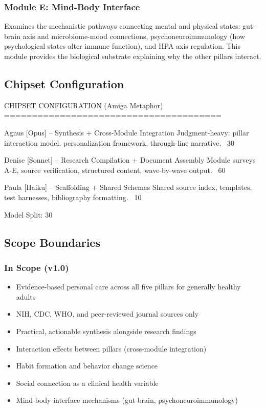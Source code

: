 \documentclass[11pt,letterpaper]{article}
\begin{document}
\subsubsection{Module E: Mind-Body Interface}
Examines the mechanistic pathways connecting mental and physical states: gut-brain axis and microbiome-mood connections, psychoneuroimmunology (how psychological states alter immune function), and HPA axis regulation. This module provides the biological substrate explaining why the other pillars interact.

\subsection{Chipset Configuration}

\begin{asciibox}
CHIPSET CONFIGURATION (Amiga Metaphor)
=======================================

  Agnus   [Opus]   -- Synthesis + Cross-Module Integration
                      Judgment-heavy: pillar interaction model,
                      personalization framework, through-line
                      narrative. ~30%

  Denise  [Sonnet] -- Research Compilation + Document Assembly
                      Module surveys A-E, source verification,
                      structured content, wave-by-wave output.
                      ~60%

  Paula   [Haiku]  -- Scaffolding + Shared Schemas
                      Shared source index, templates, test
                      harnesses, bibliography formatting.
                      ~10%

  Model Split: 30%
\end{asciibox}

\subsection{Scope Boundaries}

\subsubsection{In Scope (v1.0)}
\begin{itemize}[leftmargin=1.5em]
  \item Evidence-based personal care across all five pillars for generally healthy adults
  \item NIH, CDC, WHO, and peer-reviewed journal sources only
  \item Practical, actionable synthesis alongside research findings
  \item Interaction effects between pillars (cross-module integration)
  \item Habit formation and behavior change science
  \item Social connection as a clinical health variable
  \item Mind-body interface mechanisms (gut-brain, psychoneuroimmunology)
\end{itemize}
\end{document}
